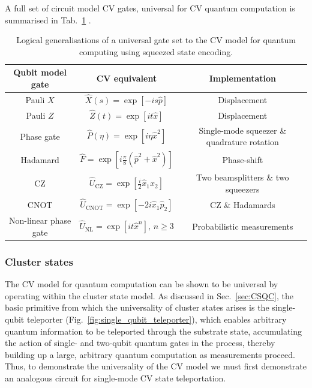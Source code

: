 A full set of circuit model CV gates, universal for CV quantum computation is summarised in Tab.~\ref{tab:CV_gates} \cite{bib:RevModPhys.84.621}.

\startnormtable
\begin{table}[!htbp]
\begin{tabular}{ |c|c|c| } 
 \hline
 Qubit model gate &  CV equivalent & Implementation \\ 
  \hline\hline
 Pauli $X$ & $\hat{X}(s) = \exp[-i s \hat p]$ & Displacement \\ 
 Pauli $Z$ & $\hat{Z}(t) = \exp[i t \hat x]$ & Displacement \\ 
 Phase gate & $\hat{P}(\eta) = \exp[i \eta \hat x^2]$ & Single-mode squeezer \& quadrature rotation \\
Hadamard   & $\hat{F}=\exp[i \frac{\pi}{8}(\hat p^2+\hat x^2)]$ & Phase-shift \\
CZ		   & $\hat{U}_\mathrm{CZ}= \exp[\frac{i}{2}\hat x_1 \hat x_2]$ & Two beamsplitters \& two squeezers \\
CNOT 	   & $\hat{U}_\mathrm{CNOT} = \exp[-2i\hat x_1 \hat p_2]$ & CZ \& Hadamards \\
Non-linear phase gate &  $\hat{U}_\mathrm{NL}=\exp[i t\hat{x}^n],\,n\geq 3$       &  Probabilistic measurements \\
\hline
\end{tabular}
\captionspacetab \caption{Logical generalisations of a universal gate set to the CV model for quantum computing using squeezed state encoding.\label{tab:CV_gates}}
\end{table}
\startalgtable

%
%

\subsubsection{Cluster states}

The CV model for quantum computation can be shown to be universal by operating within the cluster state model. As discussed in Sec.~\ref{sec:CSQC}, the basic primitive from which the universality of cluster states arises is the single-qubit teleporter (Fig.~\ref{fig:single_qubit_teleporter}), which enables arbitrary quantum information to be teleported through the substrate state, accumulating the action of single- and two-qubit quantum gates in the process, thereby building up a large, arbitrary quantum computation as measurements proceed. Thus, to demonstrate the universality of the CV model we must first demonstrate an analogous circuit for single-mode CV state teleportation.

